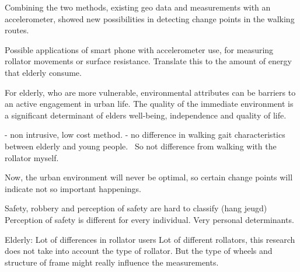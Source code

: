 Combining the two methods, existing geo data and measurements with an accelerometer, showed new possibilities in detecting change points in the walking routes. 








Possible  applications of smart phone with accelerometer use, for measuring rollator movements or surface resistance. Translate this to the amount of energy that elderly consume. 









For elderly, who are more vulnerable, environmental attributes can be barriers to an active engagement in urban life. The quality of the immediate environment is a significant determinant of elders well-being, independence and quality of life.

- non intrusive, low cost method. 
- no difference in walking gait characteristics between elderly and young people.~\cite{Wang2015} So not difference from walking with the rollator myself. 




Now, the urban environment will never be optimal, so certain change points will indicate not so important happenings. 



Safety, robbery and perception of safety are hard to classify  (hang jeugd)
Perception of safety is different for every individual. Very personal determinants. 
 

Elderly:
Lot of differences in rollator users
Lot of different rollators, this research does not take into account the type of rollator. But the type of wheels and structure of frame might really influence the measurements. 